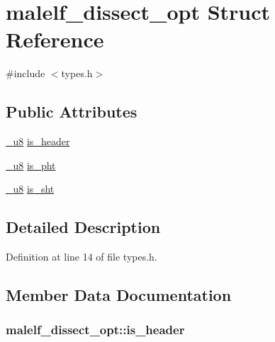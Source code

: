 \hypertarget{structmalelf__dissect__opt}{
\section{malelf\_\-dissect\_\-opt Struct Reference}
\label{structmalelf__dissect__opt}
}


{\ttfamily \#include $<$types.h$>$}

\subsection*{Public Attributes}
\begin{DoxyCompactItemize}
\item 
\hyperlink{types_8h_af2b0f13cffd24f6dddf794ae0c7472b4}{\_\-u8} \hyperlink{structmalelf__dissect__opt_aa6ceee630d61c83113d6f0469646880a}{is\_\-header}
\item 
\hyperlink{types_8h_af2b0f13cffd24f6dddf794ae0c7472b4}{\_\-u8} \hyperlink{structmalelf__dissect__opt_a6d7284ba8a221d54022192ac572a8244}{is\_\-pht}
\item 
\hyperlink{types_8h_af2b0f13cffd24f6dddf794ae0c7472b4}{\_\-u8} \hyperlink{structmalelf__dissect__opt_a9a8942b6b82bc1baac39701bc722f96d}{is\_\-sht}
\end{DoxyCompactItemize}


\subsection{Detailed Description}


Definition at line 14 of file types.h.



\subsection{Member Data Documentation}
\hypertarget{structmalelf__dissect__opt_aa6ceee630d61c83113d6f0469646880a}{
\subsubsection[{is\_\-header}]{ {\bf malelf\_\-dissect\_\-opt::is\_\-header}}}
\label{structmalelf__dissect__opt_aa6ceee630d61c83113d6f0469646880a}


